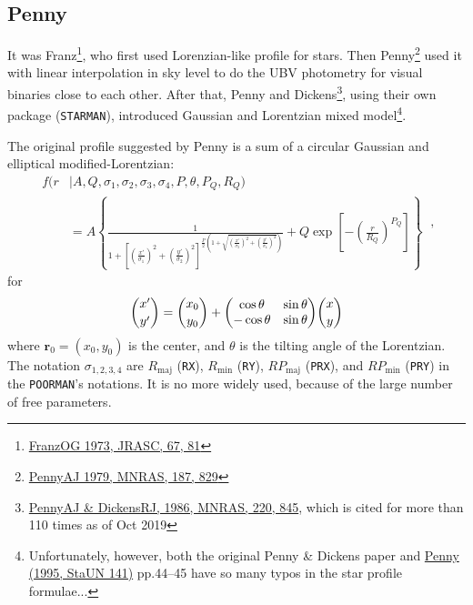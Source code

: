 \subsection{Penny}
It was Franz\footnote{ \href {https://ui.adsabs.harvard.edu/abs/1973JRASC..67...81F/abstract} {FranzOG 1973, JRASC, 67, 81}}, who first used Lorenzian-like profile for stars. Then Penny\footnote{ \href {https://ui.adsabs.harvard.edu/abs/1979MNRAS.187..829P/abstract} {PennyAJ 1979, MNRAS, 187, 829}} used it with linear interpolation in sky level to do the UBV photometry for visual binaries close to each other. After that, Penny and Dickens\footnote{ \href {https://ui.adsabs.harvard.edu/abs/1986MNRAS.220..845P/abstract} {PennyAJ \& DickensRJ, 1986, MNRAS, 220, 845}, which is cited for more than 110 times as of Oct 2019}, using their own package (\texttt{STARMAN}), introduced Gaussian and Lorentzian mixed model\footnote{Unfortunately, however, both the original Penny \& Dickens paper and \href{https://ui.adsabs.harvard.edu/abs/1995StaUN.141.....P/abstract}{Penny (1995, StaUN 141)} pp.44--45 have so many typos in the star profile formulae...}. 

The original profile suggested by Penny is a sum of a circular Gaussian and elliptical modified-Lorentzian:
\begin{equation}\label{eq: profile penny}
  \begin{aligned}
    f(r &| A, Q, \sigma_1, \sigma_2, \sigma_3, \sigma_4, P, \theta, P_Q, R_Q)  \\
    &= A 
      \left \{ 
        \frac{1}
        {1 + \left[ 
          \left( \frac{x'}{\sigma_1} \right)^2 
          + \left( \frac{y'}{\sigma_2} \right)^2 
          \right ]
          ^{\frac{P}{2} 
            \left( 1 + \sqrt{\left( \frac{x'}{\sigma_3} \right)^2 
              + \left( \frac{y'}{\sigma_4} \right)^2 } \right) 
           }}
        + Q \exp \left [ - \left ( \frac{r}{R_Q} \right )^{P_Q} \right ]
      \right \}
  \end{aligned} ~,
\end{equation}
for
\begin{equation*}
  \binom{x'}{y'} = \binom{x_0}{y_0} 
  + \mqty(\cos \theta & \sin \theta \\ -\cos \theta & \sin \theta) \binom{x}{y}
\end{equation*}
where $ \textbf{r}_0 = (x_0, y_0) $ is the center, and $ \theta $ is the tilting angle of the Lorentzian. The notation $ \sigma_{1,2,3,4} $ are $ R_\mathrm{maj} $ (\texttt{RX}), $ R_\mathrm{min} $ (\texttt{RY}), $ RP_\mathrm{maj} $ (\texttt{PRX}), and $ RP_\mathrm{min} $ (\texttt{PRY}) in the \texttt{POORMAN}'s notations. It is no more widely used, because of the large number of free parameters.

